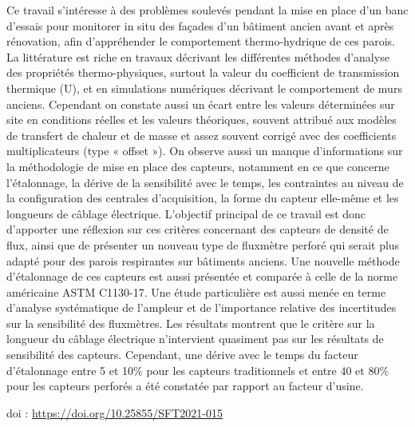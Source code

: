 {\normalsize
Ce travail s'intéresse à des problèmes soulevés pendant la mise en place d'un banc d'essais pour monitorer in situ des façades d'un bâtiment ancien avant et après rénovation, afin d'appréhender le comportement thermo-hydrique de ces parois. La littérature est riche en travaux décrivant les différentes méthodes d'analyse des propriétés thermo-physiques, surtout la valeur du coefficient de transmission thermique (U), et en simulations numériques décrivant le comportement de murs anciens. Cependant on constate aussi un écart entre les valeurs déterminées sur site en conditions réelles et les valeurs théoriques, souvent attribué aux modèles de transfert de chaleur et de masse et assez souvent corrigé avec des coefficients multiplicateurs (type « offset »). On observe aussi un manque d'informations sur la méthodologie de mise en place des capteurs, notamment en ce que concerne l'étalonnage, la dérive de la sensibilité avec le temps, les contraintes au niveau de la configuration des centrales d'acquisition, la forme du capteur elle-même et les longueurs de câblage électrique. L'objectif principal de ce travail est donc d'apporter une réflexion sur ces critères concernant des capteurs de densité de flux, ainsi que de présenter un nouveau type de fluxmètre perforé qui serait plus adapté pour des parois respirantes sur bâtiments anciens. Une nouvelle méthode d'étalonnage de ces capteurs est aussi présentée et comparée à celle de la norme américaine ASTM C1130-17. Une étude particulière est aussi menée en terme d'analyse systématique de l'ampleur et de l'importance relative des incertitudes sur la sensibilité des fluxmètres. Les résultats montrent que le critère sur la longueur du câblage électrique n'intervient quasiment pas sur les résultats de sensibilité des capteurs. Cependant, une dérive avec le temps du facteur d'étalonnage entre 5 et 10\% pour les capteurs traditionnels et entre 40 et 80\% pour les capteurs perforés a été constatée par rapport au facteur d'usine.

 \vfill doi : \url{https://doi.org/10.25855/SFT2021-015}

}
 
